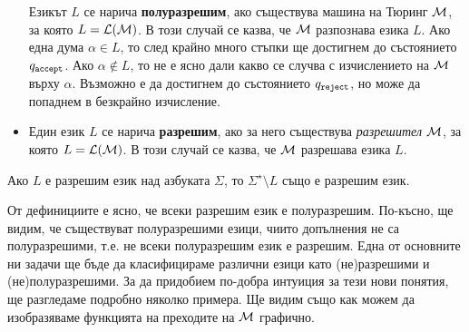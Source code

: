 \begin{itemize}
  Езикът $L$ се нарича {\bf полуразрешим}, ако съществува машина на Тюринг $\mathcal{M}$, за която
  $L = \mathcal{L}(\mathcal{M})$.
  В този случай се казва, че $\mathcal{M}$ разпознава езика $L$.
  Ако една дума $\alpha \in L$, то след крайно много стъпки ще достигнем до състоянието $q_{\texttt{accept}}$.
  Ако $\alpha \not\in L$, то не е ясно дали какво се случва с изчислението на $\mathcal{M}$ върху $\alpha$. Възможно е да достигнем до състоянието $q_{\texttt{reject}}$, но може да попаднем в безкрайно изчисление.
\item
  Един език $L$ се нарича {\bf разрешим}, ако за него съществува {\em разрешител} $\mathcal{M}$, за която
  $L = \mathcal{L}(\mathcal{M})$.
  В този случай се казва, че $\mathcal{M}$ разрешава езика $L$.
\end{itemize}

\begin{framed}
  \begin{proposition}
    Ако $L$ е разрешим език над азбуката $\Sigma$, то $\Sigma^\star \setminus L$ също е разрешим език.
  \end{proposition}
\end{framed}

От дефинициите е ясно, че всеки разрешим език е полуразрешим.
По-късно, ще видим, че съществуват полуразрешими езици, чиито допълнения не са полуразрешими,
т.е. не всеки полуразрешим език е разрешим.
Една от основните ни задачи ще бъде да класифицираме различни езици като (не)раз\-ре\-ши\-ми и (не)полуразрешими.
За да придобием по-добра интуиция за тези нови понятия, ще разгледаме подробно няколко примера.
Ще видим също как можем да изобразяваме функцията на преходите на $\mathcal{M}$ графично.


